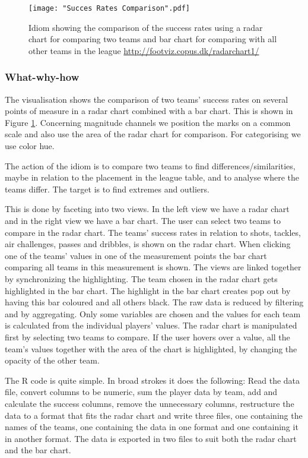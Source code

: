 \documentclass[Report.tex]{subfiles}
\begin{document}
\begin{figure}
\center
\texttt{[image: "Succes Rates Comparison".pdf]}
\caption{Idiom showing the comparison of the success rates using a radar chart for comparing two teams and bar chart for comparing with all other teams in the league \url{http://footviz.copus.dk/radarchart1/}}
\label{Fig:SuccesRates}
\end{figure}


\subsubsection{What-why-how}
The visualisation shows the comparison of two teams' success rates on several points of measure in a radar chart combined with a bar chart. This is shown in Figure \ref{Fig:SuccesRates}. Concerning magnitude channels we position the marks on a common scale and also use the area of the radar chart for comparison. For categorising we use color hue.

The action of the idiom is to compare two teams to find differences/similarities, maybe in relation to the placement in the league table, and to analyse where the teams differ. The target is to find extremes and outliers.

This is done by faceting into two views. In the left view we have a radar chart and in the right view we have a bar chart. The user can select two teams to compare in the radar chart. The teams' success rates in relation to shots, tackles, air challenges, passes and dribbles, is shown on the radar chart. When clicking one of the teams' values in one of the measurement points the bar chart comparing all teams in this measurement is shown. The views are linked together by synchronizing the highlighting. The team chosen in the radar chart gets highlighted in the bar chart. The highlight in the bar chart creates pop out by having this bar coloured and all others black.
The raw data is reduced by filtering and by aggregating. Only some variables are chosen and the values for each team is calculated from the individual players' values. 
The radar chart is manipulated first by selecting two teams to compare. If the user hovers over a value, all the team's values together with the area of the chart is highlighted, by changing the opacity of the other team.

The R code is quite simple. In broad strokes it does the following: Read the data file, convert columns to be numeric, sum the player data by team, add and calculate the success columns, remove the unnecessary columns, restructure the data to a format that fits the radar chart and write three files, one containing the names of the teams, one containing the data in one format and one containing it in another format. The data is exported in two files to suit both the radar chart and the bar chart.
\end{document}
